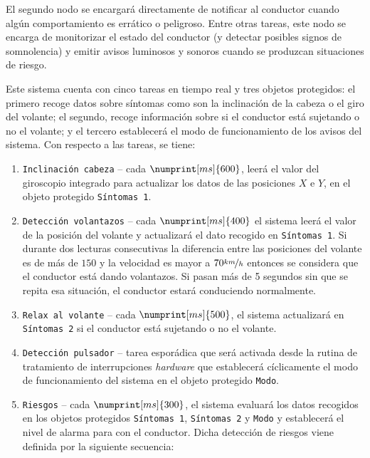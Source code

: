 El segundo nodo se encargará directamente de notificar al conductor cuando algún
comportamiento es errático o peligroso. Entre otras tareas, este nodo se encarga
de monitorizar el estado del conductor (y detectar posibles signos de somnolencia)
y emitir avisos luminosos y sonoros cuando se produzcan situaciones de riesgo.

Este sistema cuenta con cinco tareas en tiempo real y tres objetos protegidos: el
primero recoge datos sobre síntomas como son la inclinación de la cabeza o el
giro del volante; el segundo, recoge información sobre si el conductor está
sujetando o no el volante; y el tercero establecerá el modo de funcionamiento de
los avisos del sistema. Con respecto a las tareas, se tiene:

\begin{enumerate}
  \item \texttt{Inclinación cabeza} -- cada $\numprint[ms]{600}$, leerá el valor del
        giroscopio integrado para actualizar los datos de las posiciones $X$ e $Y$,
        en el objeto protegido \texttt{Síntomas 1}.
  \item \texttt{Detección volantazos} -- cada $\numprint[ms]{400}$ el sistema leerá
        el valor de la posición del volante y actualizará el dato recogido en
        \texttt{Síntomas 1}. Si durante dos lecturas consecutivas la diferencia
        entre las posiciones del volante es de más de $150$ y la velocidad es mayor
        a $70\nicefrac{km}{h}$ entonces se considera que el conductor está dando
        volantazos. Si pasan más de 5 segundos sin que se repita esa situación,
        el conductor estará conduciendo normalmente.
  \item \texttt{Relax al volante} -- cada $\numprint[ms]{500}$, el sistema actualizará
        en \texttt{Síntomas 2} si el conductor está sujetando o no el volante.
  \item \texttt{Detección pulsador} -- tarea esporádica que será activada desde la rutina
        de tratamiento de interrupciones \textit{hardware} que establecerá cíclicamente
        el modo de funcionamiento del sistema en el objeto protegido \texttt{Modo}.
  \item \texttt{Riesgos} -- cada $\numprint[ms]{300}$, el sistema evaluará los datos
        recogidos en los objetos protegidos \texttt{Síntomas 1}, \texttt{Síntomas 2} y \texttt{Modo} y
        establecerá el nivel de alarma para con el conductor. Dicha detección de riesgos
        viene definida por la siguiente secuencia:
        \begin{itemize}

\end{itemize}
\end{enumerate}
